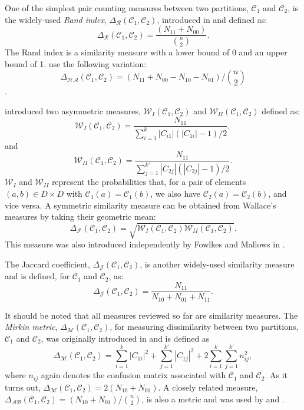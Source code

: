\documentclass[a4paper]{report}
\newcommand{\dset}{D}
\newcommand{\clus}{\mathcal{C}}
\newcommand{\partcompare}[1]{\Delta_{\mathcal{#1}}(\clus_1,\clus_2)}
\begin{document}
One of the simplest pair counting measures between two partitions, $\clus_1$
and $\clus_2$, is the widely-used \textit{Rand index}, $\partcompare{R}$,
introduced in \citep{rand-1971} and defined as:
\begin{equation*}
\partcompare{R} = \frac{(N_{11}+N_{00})}{\binom{n}{2}}.
\end{equation*}
The Rand index is a similarity measure with a lower bound of 0 and an upper
bound of 1.  \citet{hubert-arabie-1985} use the following variation:
\[\partcompare{HA} = (N_{11}+N_{00}-N_{10}-N_{01})/\binom{n}{2}\].

\citet{wallace-1983} introduced two asymmetric measures,
$\mathcal{W}_{I}(\clus_1,\clus_2)$ and $\mathcal{W}_{II}(\clus_1,\clus_2)$
defined as:
\begin{equation*}
  \mathcal{W}_{I}(\clus_1,\clus_2) =
  \frac{N_{11}}{\sum_{i=1}^{k} |C_{i1}|(|C_{1i}|-1)/2},
\end{equation*}
and
\begin{equation*}
  \mathcal{W}_{II}(\clus_1,\clus_2) =
  \frac{N_{11}}{\sum_{j=1}^{k'} |C_{2j}|(|C_{2j}|-1)/2}.
\end{equation*}
$\mathcal{W}_{I}$ and $\mathcal{W}_{II}$ represent the probabilities that, for
a pair of elements $(a,b) \in \dset \times \dset$ with
$\clus_1(a)=\clus_1(b)$, we also have $\clus_2(a)=\clus_2(b)$, and vice versa.
A symmetric similarity measure can be obtained from Wallace's measures by
taking their geometric mean:
\begin{equation*}
  \partcompare{F} = \sqrt{\mathcal{W}_{I}(\clus_1,\clus_2)
                          \mathcal{W}_{II}(\clus_1,\clus_2)}.
\end{equation*}
This measure was also introduced independently by Fowlkes and Mallows in
\citep{fowlkes-mallows-1983}.

The Jaccard coefficient, $\partcompare{J}$, is another widely-used similarity
measure and is defined, for $\clus_1$ and $\clus_2$, as:
\begin{equation*}
  \partcompare{J} = \frac{N_{11}}{N_{10}+N_{01}+N_{11}}.
\end{equation*}

It should be noted that all measures reviewed so far are similarity measures.
The \textit{Mirkin metric}, $\partcompare{M}$, for measuring dissimilarity
between two partitions, $\clus_1$ and $\clus_2$, was originally introduced in
\citep{mirkin1996mathematical} and is defined as
\begin{equation*}
  \partcompare{M} = \sum_{i=1}^{k} |C_{1i}|^2 +
                    \sum_{j=1}^{k'} |C_{1j}|^2 +
                    2\sum_{i=1}^{k}\sum_{j=1}^{k'} n_{ij}^2,
\end{equation*}
where $n_{ij}$ again denotes the confusion matrix associated with $\clus_1$
and $\clus_2$.  As it turns out, $\partcompare{M}=2(N_{10}+N_{01})$.  A
closely related measure, $\partcompare{AB}=(N_{10}+N_{01})/\binom{n}{2}$, is
also a metric and was used by \citet{mirkin1970measurement} and
\citet{arabie1973multidimensional}.
\end{document}
